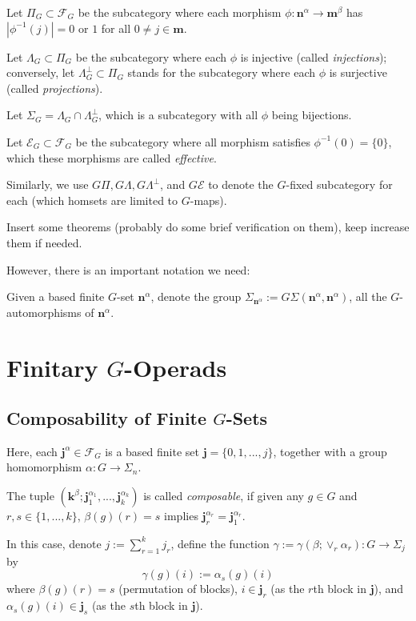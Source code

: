 \documentclass{article}
\begin{document}
\begin{defn}
    Let $\Pi_G\subset\mathscr{F}_G$ be the subcategory where each morphism $\phi:\mathbf{n}^\alpha\rightarrow\mathbf{m}^\beta$ has $|\phi^{-1}(j)|=0$ or $1$ for all $0\neq j\in\mathbf{m}$.

    Let $\Lambda_G\subset\Pi_G$ be the subcategory where each $\phi$ is injective (called \emph{injections}); conversely, let $\Lambda_G^\perp\subset\Pi_G$ stands for the subcategory where each $\phi$ is surjective (called \emph{projections}).

    Let $\Sigma_G = \Lambda_G\cap \Lambda_G^\perp$, which is a subcategory with all $\phi$ being bijections.

    Let $\mathscr{E}_G\subset\mathscr{F}_G$ be the subcategory where all morphism satisfies $\phi^{-1}(0)=\{0\}$, which these morphisms are called \emph{effective}.

    \hfil

    Similarly, we use $G\Pi, G\Lambda,G\Lambda^\perp$, and $G\mathscr{E}$ to denote the $G$-fixed subcategory for each (which homsets are limited to $G$-maps).
\end{defn}

\hfil

Insert some theorems (probably do some brief verification on them), keep increase them if needed.

However, there is an important notation we need:
\begin{notn}
    Given a based finite $G$-set $\mathbf{n}^\alpha$, denote the group $\Sigma_{\mathbf{n}^\alpha}:= G\Sigma(\mathbf{n}^\alpha,\mathbf{n}^\alpha)$, all the $G$-automorphisms of $\mathbf{n}^\alpha$.
\end{notn}

\newpage


\section{Finitary $G$-Operads}

\subsection{Composability of Finite $G$-Sets}

Here, each $\mathbf{j}^\alpha\in\mathscr{F}_G$ is a based finite set $\mathbf{j}=\{0,1,...,j\}$, together with a group homomorphism $\alpha:G\rightarrow\Sigma_n$.

\begin{defn}
    The tuple $(\mathbf{k}^\beta;\mathbf{j}_1^{\alpha_1},...,\mathbf{j}_k^{\alpha_k})$ is called \emph{composable}, if given any $g\in G$ and $r,s\in \{1,...,k\}$, $\beta(g)(r)=s$ implies $\mathbf{j}_r^{\alpha_r}=\mathbf{j}_1^{\alpha_r}$.

    In this case, denote $j:=\sum_{r=1}^k j_r$, define the function $\gamma:=\gamma(\beta;\vee_r\alpha_r):G\rightarrow \Sigma_j$ by 
    \[\gamma(g)(i):= \alpha_s(g)(i)\]
    where $\beta(g)(r)=s$ (permutation of blocks), $i\in \mathbf{j}_r$ (as the $r$th block in $\mathbf{j}$), and $\alpha_s(g)(i)\in\mathbf{j}_s$ (as the $s$th block in $\mathbf{j}$).
\end{defn}
\end{document}
